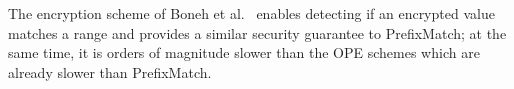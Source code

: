 The encryption scheme of Boneh et al.~\cite{BonehRange} enables detecting if an encrypted value matches a range and provides a similar security guarantee to PrefixMatch; at the same time, it is orders of magnitude slower than the OPE schemes which are already slower than PrefixMatch. 









